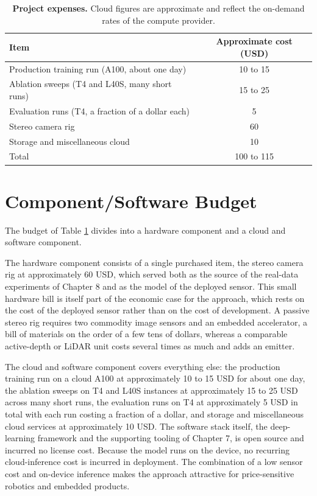 \begin{table}[!htbp]
\centering
\caption{\textbf{Project expenses.} Cloud figures are approximate and reflect the on-demand rates of the compute provider.}
\label{tab:expenses}
\small
\begin{tabular}{lc}
\toprule
Item & Approximate cost (USD)\\
\midrule
Production training run (A100, about one day) & 10 to 15\\
Ablation sweeps (T4 and L40S, many short runs) & 15 to 25\\
Evaluation runs (T4, a fraction of a dollar each) & 5\\
Stereo camera rig & 60\\
Storage and miscellaneous cloud & 10\\
\midrule
Total & 100 to 115\\
\bottomrule
\end{tabular}
\end{table}

\FloatBarrier
\section{Component/Software Budget}
The budget of Table \ref{tab:expenses} divides into a hardware component
and a cloud and software component.

The hardware component consists of a single purchased item, the stereo
camera rig at approximately 60 USD, which served both as the source of
the real-data experiments of Chapter 8 and as the model of the deployed
sensor. This small hardware bill is itself part of the economic case for
the approach, which rests on the cost of the deployed sensor rather than
on the cost of development. A passive stereo rig requires two commodity
image sensors and an embedded accelerator, a bill of materials on the
order of a few tens of dollars, whereas a comparable active-depth or
LiDAR unit costs several times as much and adds an emitter.

The cloud and software component covers everything else: the production
training run on a cloud A100 at approximately 10 to 15 USD for about one
day, the ablation sweeps on T4 and L40S instances at approximately 15 to
25 USD across many short runs, the evaluation runs on T4 at
approximately 5 USD in total with each run costing a fraction of a
dollar, and storage and miscellaneous cloud services at approximately 10
USD. The software stack itself, the deep-learning framework and the
supporting tooling of Chapter 7, is open source and incurred no license
cost. Because the model runs on the device, no recurring cloud-inference
cost is incurred in deployment. The combination of a low sensor cost and
on-device inference makes the approach attractive for price-sensitive
robotics and embedded products.

